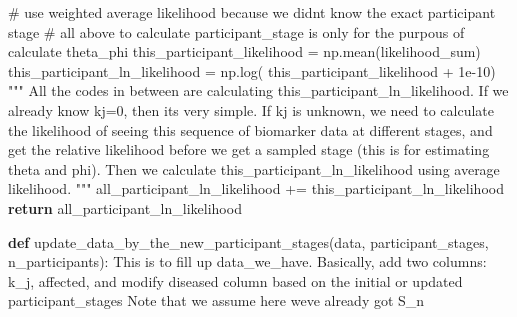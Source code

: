 \documentclass[
  letterpaper,
  DIV=11,
  numbers=noendperiod]{scrreprt}
\newenvironment{Shaded}{\begin{snugshade}}{\end{snugshade}}
\newcommand{\CommentTok}[1]{\textcolor[rgb]{0.37,0.37,0.37}{#1}}
\newcommand{\ControlFlowTok}[1]{\textcolor[rgb]{0.00,0.23,0.31}{\textbf{#1}}}
\newcommand{\FloatTok}[1]{\textcolor[rgb]{0.68,0.00,0.00}{#1}}
\newcommand{\KeywordTok}[1]{\textcolor[rgb]{0.00,0.23,0.31}{\textbf{#1}}}
\newcommand{\NormalTok}[1]{\textcolor[rgb]{0.00,0.23,0.31}{#1}}
\newcommand{\OperatorTok}[1]{\textcolor[rgb]{0.37,0.37,0.37}{#1}}
\begin{document}
\begin{Shaded}
\begin{Highlighting}[]
            \CommentTok{\# use weighted average likelihood because we didn\textquotesingle{}t know the exact participant stage}
            \CommentTok{\# all above to calculate participant\_stage is only for the purpous of calculate theta\_phi}
\NormalTok{            this\_participant\_likelihood }\OperatorTok{=}\NormalTok{ np.mean(likelihood\_sum)}
\NormalTok{            this\_participant\_ln\_likelihood }\OperatorTok{=}\NormalTok{ np.log(}
\NormalTok{                this\_participant\_likelihood }\OperatorTok{+} \FloatTok{1e{-}10}\NormalTok{)}
        \CommentTok{"""}
\CommentTok{        All the codes in between are calculating this\_participant\_ln\_likelihood. }
\CommentTok{        If we already know kj=0, then}
\CommentTok{        it\textquotesingle{}s very simple. If kj is unknown, we need to calculate the likelihood of seeing }
\CommentTok{        this sequence of biomarker}
\CommentTok{        data at different stages, and get the relative likelihood before }
\CommentTok{        we get a sampled stage (this is for estimating theta and phi). }
\CommentTok{        Then we calculate this\_participant\_ln\_likelihood using average likelihood. }
\CommentTok{        """}
\NormalTok{        all\_participant\_ln\_likelihood }\OperatorTok{+=}\NormalTok{ this\_participant\_ln\_likelihood}
    \ControlFlowTok{return}\NormalTok{ all\_participant\_ln\_likelihood}

\KeywordTok{def}\NormalTok{ update\_data\_by\_the\_new\_participant\_stages(data, participant\_stages, n\_participants):}
    \CommentTok{\textquotesingle{}\textquotesingle{}\textquotesingle{}This is to fill up data\_we\_have. }
\CommentTok{    Basically, add two columns: k\_j, affected, and modify diseased column}
\CommentTok{    based on the initial or updated participant\_stages}
\CommentTok{    Note that we assume here we\textquotesingle{}ve already got S\_n}


\end{Highlighting}
\end{Shaded}
\end{document}
